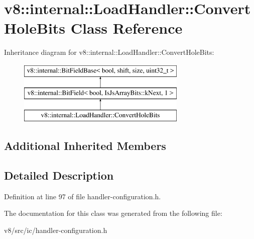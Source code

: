 \hypertarget{classv8_1_1internal_1_1LoadHandler_1_1ConvertHoleBits}{}\section{v8\+:\+:internal\+:\+:Load\+Handler\+:\+:Convert\+Hole\+Bits Class Reference}
\label{classv8_1_1internal_1_1LoadHandler_1_1ConvertHoleBits}
Inheritance diagram for v8\+:\+:internal\+:\+:Load\+Handler\+:\+:Convert\+Hole\+Bits\+:\begin{figure}[H]
\begin{center}
\leavevmode
\includegraphics[height=3.000000cm]{classv8_1_1internal_1_1LoadHandler_1_1ConvertHoleBits}
\end{center}
\end{figure}
\subsection*{Additional Inherited Members}


\subsection{Detailed Description}


Definition at line 97 of file handler-\/configuration.\+h.



The documentation for this class was generated from the following file\+:\begin{DoxyCompactItemize}
\item 
v8/src/ic/handler-\/configuration.\+h\end{DoxyCompactItemize}
